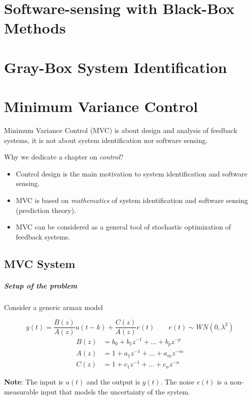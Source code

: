 
\chapter{Software-sensing with Black-Box Methods}


\chapter{Gray-Box System Identification}\label{ch5}


\chapter{Minimum Variance Control}
Minimum Variance Control (MVC) is about design and analysis of feedback systems, it is not about system identification nor software sensing.

Why we dedicate a chapter on \emph{control}?
\begin{itemize}
    \item Control design is the main motivation to system identification and software sensing.
    \item MVC is based on \emph{mathematics} of system identification and software sensing (prediction theory).
    \item MVC can be considered as a general tool of stochastic optimization of feedback systems.
\end{itemize}

\section{MVC System}

\paragraph{Setup of the problem} Consider a generic \gls{armax} model

\begin{recall}
	\[
	    y(t) = \frac{B(z)}{A(z)}u(t-k) + \frac{C(z)}{A(z)}e(t) \qquad e(t) \sim WN(0, \lambda^2)
	\]
	\begin{align*}
	    B(z) &= b_0 + b_1z^{-1} + \dots + b_pz^{-p} \\
	    A(z) &= 1   + a_1z^{-1} + \dots + a_mz^{-m} \\
	    C(z) &= 1   + c_1z^{-1} + \dots + c_nz^{-n}
	\end{align*}

	\textbf{Note}: The input is $u(t)$ and the output is $y(t)$. The noise $e(t)$ is a non-measurable input that models the uncertainty of the system.  
\end{recall}

